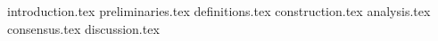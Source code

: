 {introduction.tex}
{preliminaries.tex}
{definitions.tex}
{construction.tex}
{analysis.tex}
{consensus.tex}
{discussion.tex}